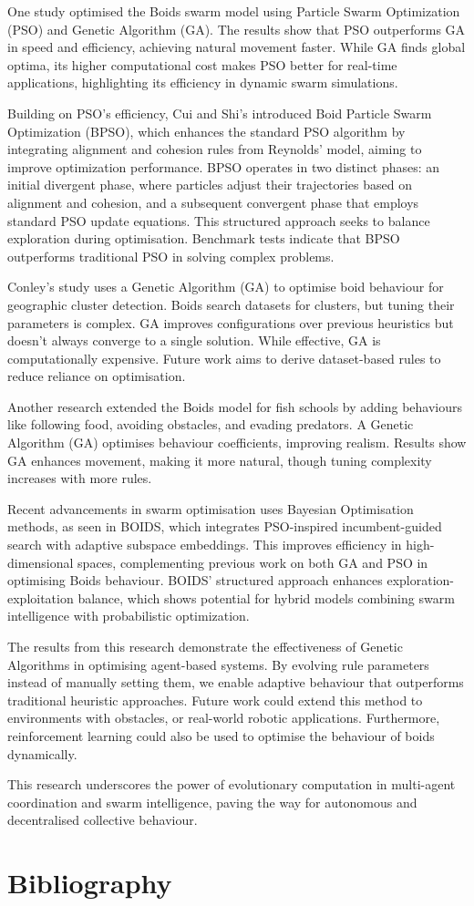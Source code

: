 \documentclass[twocolumn, a4paper, 12pt]{article}
\begin{document}
One study optimised the Boids swarm model using Particle Swarm Optimization (PSO) and Genetic Algorithm (GA). The results show that PSO outperforms GA in speed and efficiency, achieving natural movement faster. While GA finds global optima, its higher computational cost makes PSO better for real-time applications, highlighting its efficiency in dynamic swarm simulations. \cite{optimisation}

Building on PSO's efficiency, Cui and Shi's introduced Boid Particle Swarm Optimization (BPSO), which enhances the standard PSO algorithm by integrating alignment and cohesion rules from Reynolds' model, aiming to improve optimization performance. BPSO operates in two distinct phases: an initial divergent phase, where particles adjust their trajectories based on alignment and cohesion, and a subsequent convergent phase that employs standard PSO update equations. This structured approach seeks to balance exploration during optimisation. Benchmark tests indicate that BPSO outperforms traditional PSO in solving complex problems.\cite{extra_optimisation}

Conley’s study uses a Genetic Algorithm (GA) to optimise boid behaviour for geographic cluster detection. Boids search datasets for clusters, but tuning their parameters is complex. GA improves configurations over previous heuristics but doesn’t always converge to a single solution. While effective, GA is computationally expensive. Future work aims to derive dataset-based rules to reduce reliance on optimisation. \cite{Conley2005EvolvingBU}

Another research extended the Boids model for fish schools by adding behaviours like following food, avoiding obstacles, and evading predators. A Genetic Algorithm (GA) optimises behaviour coefficients, improving realism. Results show GA enhances movement, making it more natural, though tuning complexity increases with more rules. \cite{boids_ga}

Recent advancements in swarm optimisation uses Bayesian Optimisation methods, as seen in BOIDS, which integrates PSO-inspired incumbent-guided search with adaptive subspace embeddings. This improves efficiency in high-dimensional spaces, complementing previous work on both GA and PSO in optimising Boids behaviour. BOIDS’ structured approach enhances exploration-exploitation balance, which shows potential for hybrid models combining swarm intelligence with probabilistic optimization.\cite{future}

The results from this research demonstrate the effectiveness of Genetic Algorithms in optimising agent-based systems. By evolving rule parameters instead of manually setting them, we enable adaptive behaviour that outperforms traditional heuristic approaches. Future work could extend this method to environments with obstacles, or real-world robotic applications. Furthermore, reinforcement learning could also be used to optimise the behaviour of boids dynamically.

This research underscores the power of evolutionary computation in multi-agent
coordination and swarm intelligence, paving the way for autonomous and decentralised collective behaviour.


\section{Bibliography}
\printbibliography[heading=none]
\end{document}
